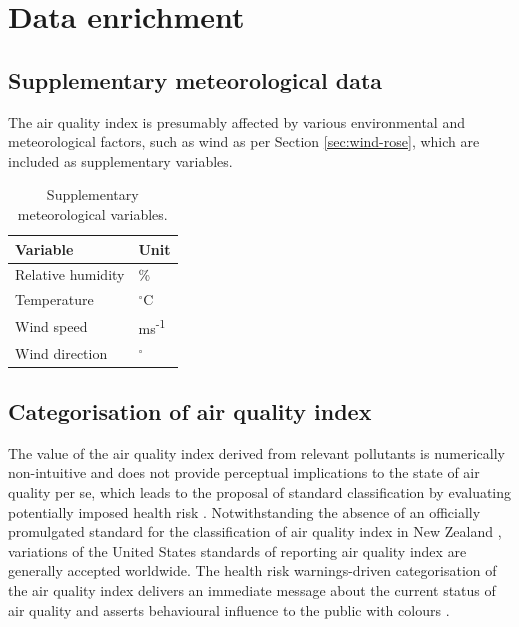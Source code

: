 \documentclass{aucklandthesis}
\begin{document}
\hypertarget{data-enrichment}{%
\section{Data enrichment}\label{data-enrichment}}

\hypertarget{supplementary-meteorological-data}{%
\subsection{Supplementary meteorological data}\label{supplementary-meteorological-data}}

The air quality index is presumably affected by various environmental and meteorological factors, such as wind as per Section \ref{sec:wind-rose}, which are included as supplementary variables.

\begin{table}[ht]
\begin{center}
\begin{tabular}{ll}
\toprule
Variable & Unit \\
\midrule
Relative humidity & \% \\
Temperature & $^{\circ}$C \\
Wind speed & ms\textsuperscript{-1} \\
Wind direction & $^{\circ}$ \\
\bottomrule
\end{tabular}
\caption{Supplementary meteorological variables.}
\label{tab:met-dataset}
\end{center}
\end{table}

\hypertarget{categorisation-of-air-quality-index}{%
\subsection{Categorisation of air quality index}\label{categorisation-of-air-quality-index}}

The value of the air quality index derived from relevant pollutants is numerically non-intuitive and does not provide perceptual implications to the state of air quality per se, which leads to the proposal of standard classification by evaluating potentially imposed health risk \autocite{aqidef}. Notwithstanding the absence of an officially promulgated standard for the classification of air quality index in New Zealand \autocite{nzaqrg}, variations of the United States standards of reporting air quality index \autocite{usaqrs} are generally accepted worldwide. The health risk warnings-driven categorisation of the air quality index delivers an immediate message about the current status of air quality and asserts behavioural influence to the public with colours \autocite{colwarn}.
\end{document}
